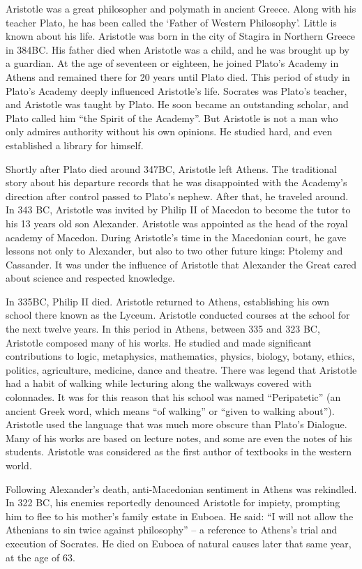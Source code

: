 \documentclass{article}
\begin{document}
Aristotle was a great philosopher and polymath in ancient Greece. Along with his teacher Plato, he has been called the `Father of Western Philosophy'. Little is known about his life. Aristotle was born in the city of Stagira in Northern Greece in 384BC. His father died when Aristotle was a child, and he was brought up by a guardian. At the age of seventeen or eighteen, he joined Plato's Academy in Athens and remained there for 20 years until Plato died. This period of study in Plato's Academy deeply influenced Aristotle's life. Socrates was Plato's teacher, and Aristotle was taught by Plato. He soon became an outstanding scholar, and Plato called him ``the Spirit of the Academy''. But Aristotle is not a man who only admires authority without his own opinions. He studied hard, and even established a library for himself.

Shortly after Plato died around 347BC, Aristotle left Athens. The traditional story about his departure records that he was disappointed with the Academy's direction after control passed to Plato's nephew. After that, he traveled around. In 343 BC, Aristotle was invited by Philip II of Macedon to become the tutor to his 13 years old son Alexander. Aristotle was appointed as the head of the royal academy of Macedon. During Aristotle's time in the Macedonian court, he gave lessons not only to Alexander, but also to two other future kings: Ptolemy and Cassander. It was under the influence of Aristotle that Alexander the Great cared about science and respected knowledge.

In 335BC, Philip II died. Aristotle returned to Athens, establishing his own school there known as the Lyceum. Aristotle conducted courses at the school for the next twelve years. In this period in Athens, between 335 and 323 BC, Aristotle composed many of his works. He studied and made significant contributions to logic, metaphysics, mathematics, physics, biology, botany, ethics, politics, agriculture, medicine, dance and theatre. There was legend that Aristotle had a habit of walking while lecturing along the walkways covered with colonnades. It was for this reason that his school was named ``Peripatetic'' (an ancient Greek word, which means ``of walking'' or ``given to walking about''). Aristotle used the language that was much more obscure than Plato's Dialogue. Many of his works are based on lecture notes, and some are even the notes of his students. Aristotle was considered as the first author of textbooks in the western world.

Following Alexander's death, anti-Macedonian sentiment in Athens was rekindled. In 322 BC, his enemies reportedly denounced Aristotle for impiety, prompting him to flee to his mother's family estate in Euboea. He said: ``I will not allow the Athenians to sin twice against philosophy'' – a reference to Athens's trial and execution of Socrates. He died on Euboea of natural causes later that same year, at the age of 63.
\end{document}
